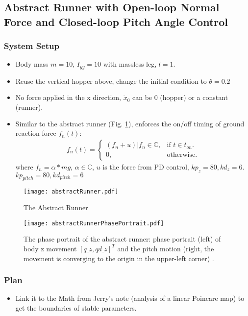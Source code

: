 \subsection{Abstract Runner with Open-loop Normal Force  and Closed-loop Pitch Angle Control}
\subsubsection*{System Setup}
\begin{itemize}
\item Body mass $m=10 $, $I_{yy}=10$ with massless leg, $l=1 $.
\item Reuse the vertical hopper above, change the initial condition to $\theta = 0.2$
\item No force applied in the x direction, $\dot x_0$ can be 0 (hopper) or a constant (runner).
\item Similar to the abstract runner (Fig. \ref{fig.abstractRunner}), enforces the on/off timing of ground reaction force $f_n(t)$:
\begin{align*}
 f_n(t)=\begin{cases}
    (f_n + u)|f_n\in \mathbb{C}, & \text{if $t \in t_{on}$}.\\
    0, & \text{otherwise}.
  \end{cases}
\end{align*}
where $f_n = \alpha*mg$, $\alpha\in \mathbb{C}$, $u$ is the force from PD control, $kp_z= 80, kd_z = 6$. $kp_{pitch}= 80, kd_{pitch} = 6$
\end{itemize}


\begin{figure}[h]
\centering

\texttt{[image: abstractRunner.pdf]} 
\caption{The Abstract Runner}
\label{fig.abstractRunner}
\end{figure}

\begin{figure}[H]
\centering

\texttt{[image: abstractRunnerPhasePortrait.pdf]} 
\caption{The phase portrait of the abstract runner: phase portrait (left) of body z movement $[q\_z, qd\_z]^T$ and the pitch motion (right, the movement is converging to the origin in the upper-left corner) .}
\end{figure}
\subsubsection*{Plan}
\begin{itemize}
\item Link it to the Math from Jerry's note (analysis of a linear Poincare map) to get the boundaries of stable parameters.
\end{itemize}
